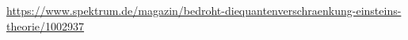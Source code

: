 \url{https://www.spektrum.de/magazin/bedroht-diequantenverschraenkung-einsteins-theorie/1002937}

 









